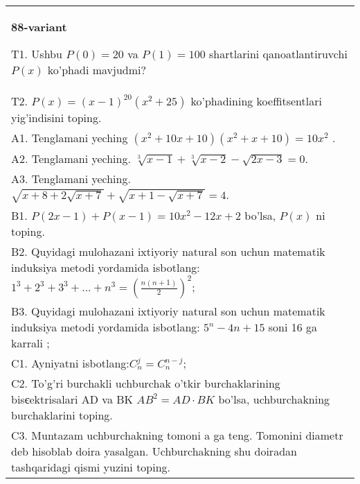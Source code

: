 \documentclass{article}
\begin{document}
\begin{tabular}{m{17cm}}
\textbf{88-variant}
\newline

T1. Ushbu \(P(0) = 20\) va \(P(1) = 100\) shartlarini qanoatlantiruvchi \(P(x)\) ko'phadi mavjudmi? \\
T2. \(P(x) = (x - 1)^{20}\left( x^{2} + 25 \right)\) ko'phadining koeffitsentlari yig'indisini toping. \\
A1. Tenglamani yeching \(\left( x^{2} + 10x + 10 \right)\left( x^{2} + x + 10 \right) = 10x^{2}\) . \\
A2. Tenglamani yeching. \(\sqrt[3]{x - 1} + \sqrt[3]{x - 2} - \sqrt{2x - 3} = 0\). \\
A3. Tenglamani yeching. \(\sqrt{x + 8 + 2\sqrt{x + 7}} + \sqrt{x + 1 - \sqrt{x + 7}} = 4\). \\
B1. \(P(2x - 1) + P(x - 1) = 10x^{2} - 12x + 2\) bo'lsa, \(P(x)\) ni toping. \\
B2. Quyidagi mulohazani ixtiyoriy natural son uchun matematik induksiya metodi yordamida isbotlang: \(1^{3} + 2^{3} + 3^{3} + ... + n^{3} = \left( \frac{n(n + 1)}{2} \right)^{2}\); \\
B3. Quyidagi mulohazani ixtiyoriy natural son uchun matematik induksiya metodi yordamida isbotlang: \(5^{n} - 4n + 15\) soni 16 ga karrali ; \\
C1. Ayniyatni isbotlang:\(C_{n}^{j} = C_{n}^{n - j}\); \\
C2. To'g'ri burchakli uchburchak o'tkir burchaklarining bisєektrisalari AD va BK \(AB^{2} = AD \cdot BK\) bo'lsa, uchburchakning burchaklarini toping. \\
C3. Muntazam uchburchakning tomoni a ga teng. Tomonini diametr deb hisoblab doira yasalgan. Uchburchakning shu doiradan tashqaridagi qismi yuzini toping. \\

\end{tabular}
\vspace{1cm}
\end{document}
